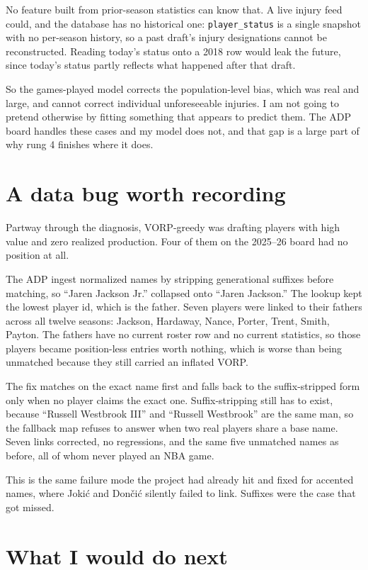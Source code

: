 \documentclass[11pt]{article}
\begin{document}
No feature built from prior-season statistics can know that. A live injury feed
could, and the database has no historical one: \texttt{player\_status} is a single
snapshot with no per-season history, so a past draft's injury designations cannot
be reconstructed. Reading today's status onto a 2018 row would leak the future,
since today's status partly reflects what happened after that draft.

So the games-played model corrects the population-level bias, which was real and
large, and cannot correct individual unforeseeable injuries. I am not going to
pretend otherwise by fitting something that appears to predict them. The ADP board
handles these cases and my model does not, and that gap is a large part of why
rung 4 finishes where it does.

\section{A data bug worth recording}

Partway through the diagnosis, VORP-greedy was drafting players with high value
and zero realized production. Four of them on the 2025--26 board had no position
at all.

The ADP ingest normalized names by stripping generational suffixes before
matching, so ``Jaren Jackson Jr.'' collapsed onto ``Jaren Jackson.'' The lookup
kept the lowest player id, which is the father. Seven players were linked to their
fathers across all twelve seasons: Jackson, Hardaway, Nance, Porter, Trent, Smith,
Payton. The fathers have no current roster row and no current statistics, so those
players became position-less entries worth nothing, which is worse than being
unmatched because they still carried an inflated VORP.

The fix matches on the exact name first and falls back to the suffix-stripped form
only when no player claims the exact one. Suffix-stripping still has to exist, because
``Russell Westbrook III'' and ``Russell Westbrook'' are the same man, so the
fallback map refuses to answer when two real players share a base name. Seven
links corrected, no regressions, and the same five unmatched names as before, all
of whom never played an NBA game.

This is the same failure mode the project had already hit and fixed for accented
names, where Joki\'c and Don\v{c}i\'c silently failed to link. Suffixes were the
case that got missed.

\section{What I would do next}
\end{document}

